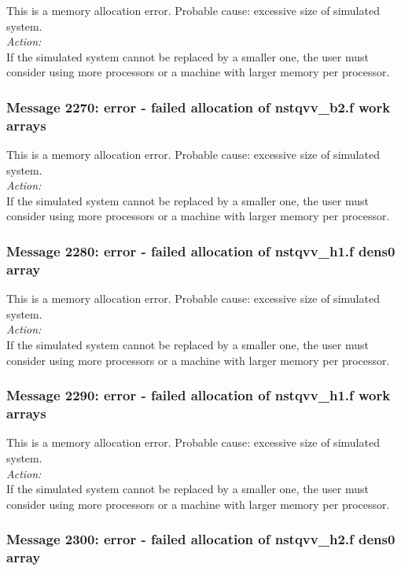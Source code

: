 This is a memory allocation error. Probable cause: excessive size of
simulated system. \\

\noindent
{\em Action:}\\
If the simulated system cannot be replaced by a smaller one, the user
must consider using more processors or a machine with larger memory
per processor.

\subsubsection*{Message 2270: error - failed allocation of nstqvv\_b2.f
work arrays}

This is a memory allocation error. Probable cause: excessive size of
simulated system. \\

\noindent
{\em Action:}\\
If the simulated system cannot be replaced by a smaller one, the user
must consider using more processors or a machine with larger memory
per processor.

\subsubsection*{Message 2280: error - failed allocation of nstqvv\_h1.f
dens0 array}

This is a memory allocation error. Probable cause: excessive size of
simulated system. \\

\noindent
{\em Action:}\\
If the simulated system cannot be replaced by a smaller one, the user
must consider using more processors or a machine with larger memory
per processor.

\subsubsection*{Message 2290: error - failed allocation of nstqvv\_h1.f
work arrays}

This is a memory allocation error. Probable cause: excessive size of
simulated system. \\

\noindent
{\em Action:}\\
If the simulated system cannot be replaced by a smaller one, the user
must consider using more processors or a machine with larger memory
per processor.

\subsubsection*{Message 2300: error - failed allocation of nstqvv\_h2.f
dens0 array}

